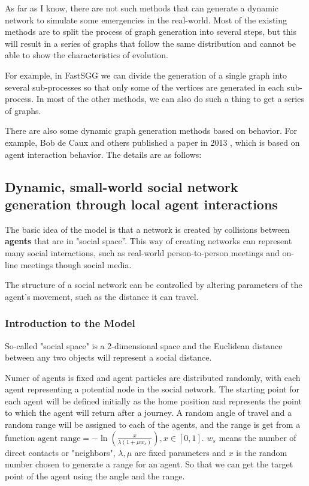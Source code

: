 \begin{survey}
As far as I know, there are not such methods that can generate a dynamic
network to simulate some emergencies in the real-world. Most of the
existing methods are to split the process of graph generation into
several steps, but this will result in a series of graphs that follow
the same distribution and cannot be able to show the characteristics of
evolution.

For example, in FastSGG we can divide the generation of a single graph
into several sub-processes so that only some of the vertices are
generated in each sub-process. In most of the other methods, we can also
do such a thing to get a series of graphs.

There are also some dynamic graph generation methods based on behavior.
For example, Bob de Caux and others published a paper in 2013 \cite{De2014Dynamic}, which is based on
agent interaction behavior. The details are as follows:

\subsection{Dynamic, small-world social network generation through
local agent interactions\cite{De2014Dynamic}}

The basic idea of the model is that a network is created by collisions
between \textbf{agents} that are in "social space''. This way of
creating networks can represent many social interactions, such as
real-world person-to-person meetings and on-line meetings though social
media.

The structure of a social network can be controlled by altering
parameters of the agent's movement, such as the distance it can travel.

\subsubsection{Introduction to the Model}

So-called "social space" is a 2-dimensional space and the Euclidean
distance between any two objects will represent a social distance.

Numer of agents is fixed and agent particles are distributed randomly,
with each agent representing a potential node in the social network. The
starting point for each agent will be defined initially as the home
position and represents the point to which the agent will return after a
journey. A random angle of travel and a random range will be assigned to
each of the agents, and the range is get from a function
\(\text{agent range} =-\ln \left(\frac{x}{\lambda\left(1+\mu w_{s}\right)}\right), x\in [0,1]\).
\(w_s\) means the number of direct contacts or "neighbors",
\(\lambda, \mu\) are fixed parameters and \(x\) is the random number
chosen to generate a range for an agent. So that we can get the target
point of the agent using the angle and the range.


\end{survey}
